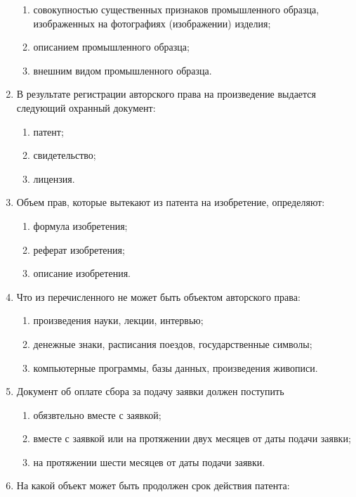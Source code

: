 \begin{enumerate}
    \begin{enumerate}
        \item \cmark совокупностью существенных признаков промышленного образца, изображенных на фотографиях (изображении) изделия;
        \item описанием промышленного образца;
        \item внешним видом промышленного образца.
    \end{enumerate}
    \item В результате регистрации авторского права на произведение выдается следующий охранный документ:
    \begin{enumerate}
        \item патент;
        \item свидетельство;
        \item \cmark лицензия.
    \end{enumerate}
    \item Объем прав, которые вытекают из патента на изобретение, определяют:
    \begin{enumerate}
        \item \cmark формула изобретения;
        \item реферат изобретения;
        \item описание изобретения.
    \end{enumerate}
    \item Что из перечисленного не может быть объектом авторского права:
    \begin{enumerate}
        \item произведения науки, лекции, интервью;
        \item \cmark денежные знаки, расписания поездов, государственные символы;
        \item компьютерные программы, базы данных, произведения живописи.
    \end{enumerate}
    \item Документ об оплате сбора за подачу заявки должен поступить
    \begin{enumerate}
        \item \cmark обязвтельно вместе с заявкой;
        \item вместе с заявкой или на протяжении двух месяцев от даты подачи заявки;
        \item на протяжении шести месяцев от даты подачи заявки. 
    \end{enumerate}
    \item На какой  объект может быть продолжен  срок действия патента:

\end{enumerate}

